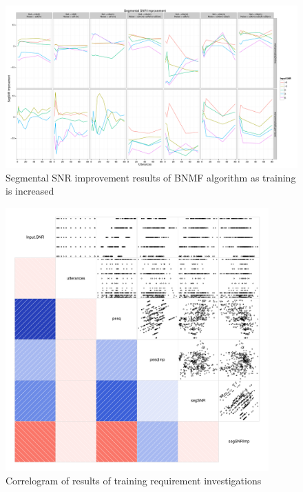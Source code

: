 \begin{figure}[p]
\noindent \begin{centering}
\includegraphics[angle=90,width=1\textwidth,height=0.95\textheight]{fig/R/train/segSNRImp}
\par\end{centering}

\protect\caption{\label{fig:vary-train-segsnr-imp}Segmental \acs{SNR} improvement
results of \acs{BNMF} algorithm as training is increased}
\end{figure}


\begin{figure}[h]


\noindent \begin{centering}
\includegraphics[width=0.9\textwidth]{fig/R/train/corr}
\par\end{centering}

\protect\caption{\label{fig:train-req-corr}Correlogram of results of training requirement
investigations}
\end{figure}



